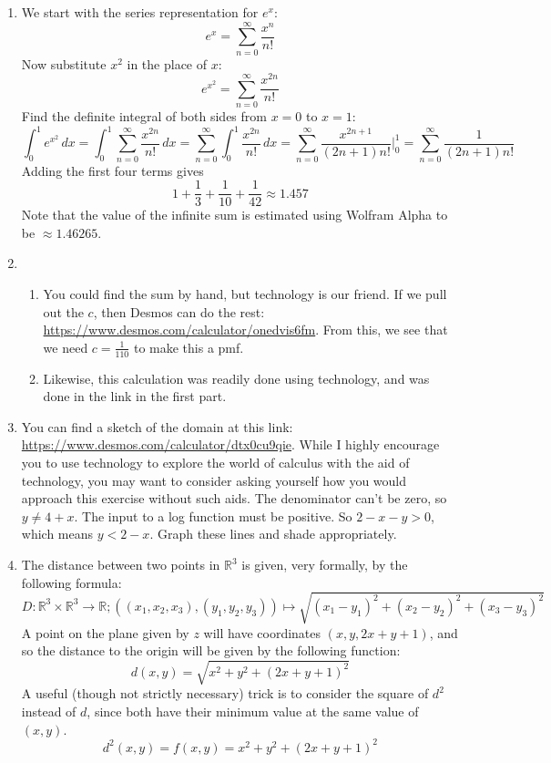 \documentclass{article}
\newcommand{\R}{\mathbb{R}}
\begin{document}
    \begin{enumerate}
    \item We start with the series representation for $e^x$:
    $$e^x = \sum_{n=0}^\infty \frac{x^n}{n!}$$
    Now substitute $x^2$ in the place of $x$:
        $$e^{x^2} = \sum_{n=0}^\infty \frac{x^{2n}}{n!}$$
    Find the definite integral of both sides from $x=0$ to $x=1$:
     $$\int_0^1 e^{x^2}\,dx = \int_0^1 \sum_{n=0}^\infty \frac{x^{2n}}{n!}\,dx = \sum_{n=0}^\infty \int_0^1\frac{x^{2n}}{n!}\,dx = \sum_{n=0}^\infty\frac{x^{2n+1}}{(2n+1)n!}\biggr|_0^1=\sum_{n=0}^\infty\frac{1}{(2n+1)n!}$$
     Adding the first four terms gives
     $$1+\frac{1}{3} + \frac{1}{10} + \frac{1}{42}\approx 1.457$$
     Note that the value of the infinite sum is estimated using Wolfram Alpha to be $\approx 1.46265.$
     \item 
     \begin{enumerate}
     \item  You could find the sum by hand, but technology is our friend.  If we pull out the $c$, then Desmos can do the rest: \url{https://www.desmos.com/calculator/onedvis6fm}. From this, we see that we need $c=\frac{1}{110}$ to make this a pmf.
     \item Likewise, this calculation was readily done using technology, and was done in the link in the first part.
   \end{enumerate} 
    \item You can find a sketch of the domain at this link: \url{https://www.desmos.com/calculator/dtx0cu9qie}. While I highly encourage you to use technology to explore the world of calculus with the aid of technology, you may want to consider asking yourself how you would approach this exercise without such aids. The denominator can't be zero, so $y\neq 4+x$. The input to a log function must be positive. So $2-x-y>0$, which means $y < 2-x$. Graph these lines and shade appropriately.
    \item The distance between two points in $\R^3$ is given, very formally, by the following formula:
    \[D:\R^3\times \R^3 \to \R; \left((x_1,x_2,x_3),(y_1,y_2,y_3)\right)\mapsto \sqrt{(x_1-y_1)^2+(x_2-y_2)^2+(x_3-y_3)^2}\]
    A point on the plane given by $z$ will have coordinates $(x,y,2x+y+1)$, and so the distance to the origin will be given by the following function:
    \[d(x,y) = \sqrt{x^2+y^2+(2x+y+1)^2}\]
    A useful (though not strictly necessary) trick is to consider the square of $d^2$ instead of $d$, since both have their minimum value at the same value of $(x,y)$.
    \[d^2(x,y) = f(x,y) = x^2+y^2+(2x+y+1)^2\]

\end{enumerate}
\end{document}
